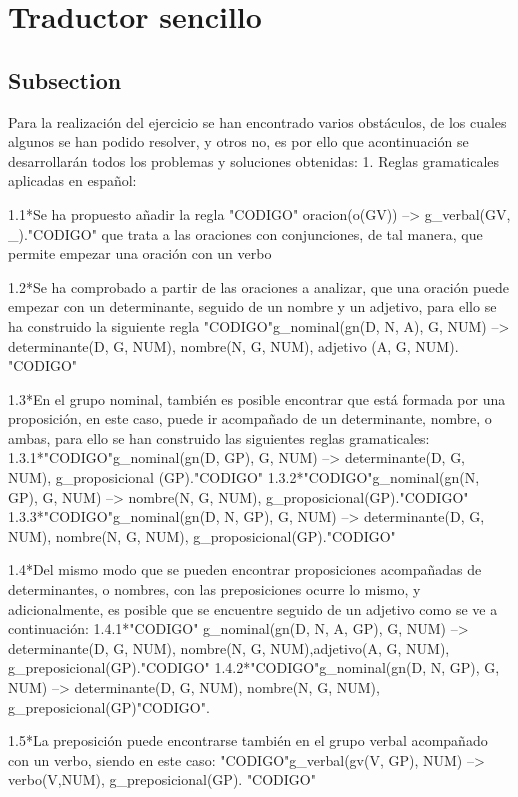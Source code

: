 ﻿\documentclass[a4paper]{article}
\begin{document}
    \section*{Traductor sencillo}
    \subsection*{Subsection}
 Para la realización del ejercicio se han encontrado varios obstáculos, de los cuales algunos se han podido resolver, y otros no, es por ello que acontinuación se desarrollarán todos los problemas y soluciones obtenidas:
 1. Reglas gramaticales aplicadas en español:
    
 1.1*Se ha propuesto añadir la regla  "CODIGO" oracion(o(GV)) --> g_verbal(GV, _)."CODIGO" que      trata a las oraciones con conjunciones, de tal manera, que permite empezar una oración con un      verbo
    
 1.2*Se ha comprobado a partir de las oraciones a analizar, que una oración puede empezar con un     determinante, seguido de un nombre y un adjetivo, para ello se ha construido la siguiente regla     "CODIGO"g_nominal(gn(D, N, A), G, NUM) --> determinante(D, G, NUM), nombre(N, G, NUM), adjetivo       (A, G, NUM). "CODIGO"
    
 1.3*En el grupo nominal, también es posible encontrar que está formada por una proposición, en este     caso, puede ir acompañado de un determinante, nombre, o ambas, para ello se han construido las     siguientes reglas gramaticales: 
            1.3.1*"CODIGO"g_nominal(gn(D, GP), G, NUM) --> determinante(D, G, NUM), g_proposicional            (GP)."CODIGO"
            1.3.2*"CODIGO"g_nominal(gn(N, GP), G, NUM) --> nombre(N, G, NUM), g_proposicional(GP)."CODIGO"
            1.3.3*"CODIGO"g_nominal(gn(D, N, GP), G, NUM) --> determinante(D, G, NUM), nombre(N, G, NUM),               g_proposicional(GP)."CODIGO"
     
 1.4*Del mismo modo que se pueden encontrar proposiciones acompañadas de determinantes, o nombres,      con las preposiciones ocurre lo mismo, y adicionalmente, es posible  que se encuentre seguido de      un adjetivo como se ve a continuación:
            1.4.1*"CODIGO" g_nominal(gn(D, N, A, GP), G, NUM) --> determinante(D, G, NUM), nombre(N, G,             NUM),adjetivo(A, G, NUM), g_preposicional(GP)."CODIGO"
            1.4.2*"CODIGO"g_nominal(gn(D, N, GP), G, NUM) --> determinante(D, G, NUM), nombre(N, G, NUM),             g_preposicional(GP)"CODIGO".
     
 1.5*La preposición puede encontrarse también en el grupo verbal acompañado con un verbo, siendo en       este caso: "CODIGO"g_verbal(gv(V, GP), NUM) --> verbo(V,NUM), g_preposicional(GP). "CODIGO"
     
\end{document}
